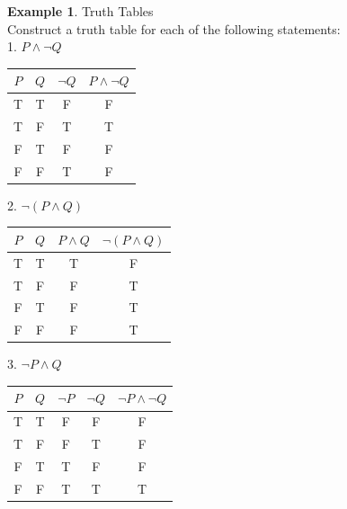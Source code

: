 \documentclass{book}
\theoremstyle{definition}
\newtheorem{example}{Example}[definition]
\theoremstyle{remark}
\begin{document}
\begin{example}
Truth Tables \cite[Chap.2, P.C.2.2]{ted} \\

Construct a truth table for each of the following statements: \\


1. $P \wedge \neg Q$  \\

\begin{center}
    \begin{tabular}{|c|c|c|c|}
        \hline 
        $P$ & $Q$ & $\neg Q$ & $P \wedge \neg Q$ \\ 
        \hline 
        T & T & F & F \\ 
        \hline 
        T & F & T & T \\ 
        \hline 
        F & T & F & F \\ 
        \hline 
        F & F & T & F \\ 
        \hline 
    \end{tabular} 
\end{center}

2. $\neg (P \wedge Q)$ \\

\begin{center}
    \begin{tabular}{|c|c|c|c|}
        \hline 
        $P$ & $Q$ & $P 	\wedge Q$ & $\neg (P \wedge Q)$ \\ 
        \hline 
        T & T & T & F \\ 
        \hline 
        T & F & F & T \\ 
        \hline 
        F & T & F & T \\ 
        \hline 
        F & F & F & T \\ 
        \hline 
    \end{tabular} 
\end{center}

3. $\neg P \wedge Q$ \\

\begin{center}
    \begin{tabular}{|c|c|c|c|c|}
        \hline 
        $P$ & $Q$ & $\neg P$ & $\neg Q$ & $\neg P \wedge \neg Q$\\ 
        \hline 
        T & T & F & F & F \\ 
        \hline 
        T & F & F & T & F \\ 
        \hline 
        F & T & T & F & F \\ 
        \hline 
        F & F & T & T & T \\ 
        \hline 
    \end{tabular} 
\end{center}


\end{example}
\end{document}

